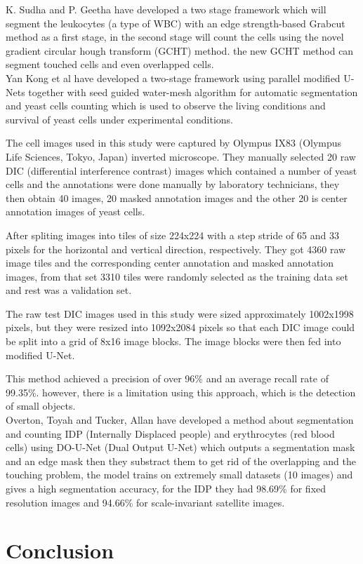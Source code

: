 K. Sudha and P. Geetha \textsuperscript{\cite{SUDHA2020639}} have developed a two stage framework which will segment the leukocytes (a type of WBC) with an edge strength-based Grabcut method as a first stage, in the second stage will count the cells using the novel gradient circular hough transform (GCHT) method. the new GCHT method can segment touched cells and even overlapped cells.\\

Yan Kong et al \textsuperscript{\cite{Kong:20}} have developed a two-stage framework using parallel modified U-Nets together with seed guided water-mesh algorithm for automatic segmentation and yeast cells counting which is used to observe the living conditions and survival of yeast cells under experimental conditions.

The cell images used in this study were captured by Olympus IX83 (Olympus Life Sciences, Tokyo, Japan) inverted microscope. They manually selected 20 raw DIC (differential interference contrast) images which contained a number of yeast cells and the annotations were done manually by laboratory technicians, they then obtain 40 images, 20 masked annotation images and the other 20 is center annotation images of yeast cells.

After spliting images into tiles of size 224x224 with a step stride of 65 and 33 pixels for the horizontal and vertical direction, respectively. They got 4360 raw image tiles and the corresponding center annotation and masked annotation images, from that set 3310 tiles were randomly selected as the training data set and rest was a validation set.

The raw test DIC images used in this study were sized approximately 1002x1998 pixels, but they were resized into 1092x2084 pixels so that each DIC image could be split into a grid of 8x16 image blocks. The image blocks were then fed into modified U-Net.

\newpage

This method achieved a precision of over 96\% and an average recall rate of 99.35\%. however, there is a limitation using this approach, which is the detection of small objects.\\

Overton, Toyah and Tucker, Allan \textsuperscript{\cite{10.1007/978-3-030-44584-3_31}} have developed a method about segmentation and counting IDP (Internally Displaced people) and erythrocytes (red blood cells) using DO-U-Net (Dual Output U-Net) which outputs a segmentation mask and an edge mask then they substract them to get rid of the overlapping and the touching problem, the model trains on extremely small datasets (10 images) and gives a high segmentation accuracy, for the IDP they had 98.69\% for fixed resolution images and 94.66\% for scale-invariant satellite images.\\

\section{Conclusion}
\vspace{0.1in}
\hspace*{0.16in}
